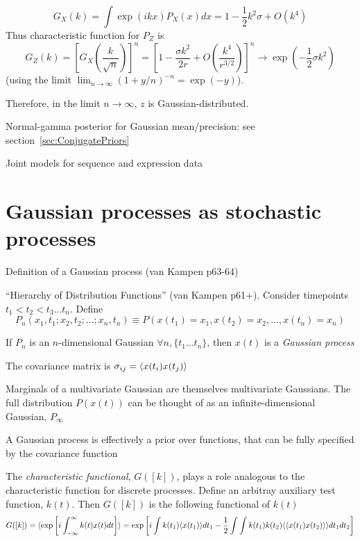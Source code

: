 \documentclass{beamer}
\begin{document}
\begin{frame}{}
\[
G_X(k) = \int \exp(ikx) P_X(x) dx = 1 - \frac{1}{2} k^2 \sigma + O(k^4)
\]
Thus characteristic function for $P_Z$ is
\[
G_Z(k) = \left[ G_X \left( \frac{k}{\sqrt{n}} \right) \right]^n
 = \left[ 1 - \frac{\sigma k^2}{2r} + O \left( \frac{k^4}{r^{3/2}} \right) \right]^n
 \to \exp(-\frac{1}{2} \sigma k^2)
\]
(using the limit $\lim_{n \to \infty} (1+y/n)^{-n} = \exp(-y)$).
   \item Therefore, in the limit $n \to \infty$, $z$ is Gaussian-distributed.
   \iteme
  \item Normal-gamma posterior for Gaussian mean/precision: see section~\ref{sec:ConjugatePriors}
  \item Joint models for sequence and expression data
  \iteme
\iteme

\end{frame}


\section{Gaussian processes as stochastic processes}

\begin{frame}{}

\itemb
\item Definition of a Gaussian process (van Kampen p63-64)
 \itemb
 \item ``Hierarchy of Distribution Functions'' (van Kampen p61+). Consider timepoints $t_1 < t_2 < t_3 \ldots t_n$. Define
\[
P_n(x_1,t_1;x_2,t_2;\ldots;x_n,t_n) \equiv P(x(t_1) = x_1, x(t_2) = x_2, \ldots, x(t_n) = x_n)
\]
 \item If $P_n$ is an $n$-dimensional Gaussian $\forall n, \{ t_1 \ldots t_n \}$, then $x(t)$ is a {\em Gaussian process}
 \item The covariance matrix is $\sigma_{ij} = \langle x(t_i) x(t_j) \rangle$
 \item Marginals of a multivariate Gaussian are themselves multivariate Gaussians.
The full distribution $P(x(t))$ can be thought of as an infinite-dimensional Gaussian, $P_\infty$
 \item A Gaussian process is effectively a prior over functions, that can be fully specified by the covariance function
 \iteme
 \item The {\em characteristic functional}, $G([k])$, plays a role analogous to the characteristic function for discrete processes.
Define an arbitray auxiliary test function, $k(t)$. Then $G([k])$ is the following functional of $k(t)$
\[
G([k]) = \langle \exp \left[ i \int_{-\infty}^{\infty} k(t) x(t) dt \right] \rangle
= \exp \left[ i\int k(t_1) \langle x(t_1) \rangle dt_1 - \frac{1}{2} \int \int k(t_1)k(t_2) \langle \langle x(t_1)x(t_2) \rangle \rangle dt_1 dt_2 \right]
\]
\iteme

\end{frame}
\end{document}
